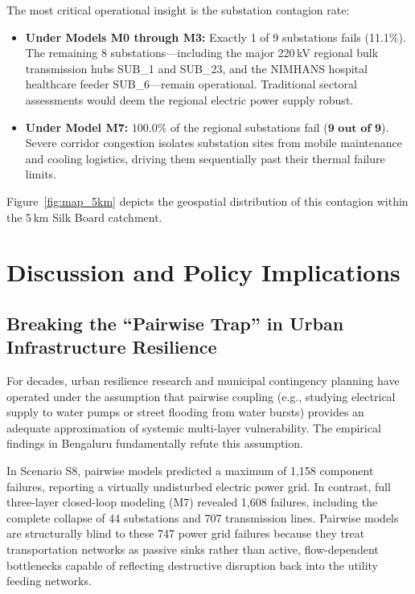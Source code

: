 The most critical operational insight is the substation contagion rate:
\begin{itemize}
    \item \textbf{Under Models M0 through M3:} Exactly 1 of 9 substations fails (11.1\%). The remaining 8 substations---including the major 220\,kV regional bulk transmission hubs SUB\_1 and SUB\_23, and the NIMHANS hospital healthcare feeder SUB\_6---remain operational. Traditional sectoral assessments would deem the regional electric power supply robust.
    \item \textbf{Under Model M7:} $\mathbf{100.0\%}$ of the regional substations fail ($\mathbf{9\text{ out of }9}$). Severe corridor congestion isolates substation sites from mobile maintenance and cooling logistics, driving them sequentially past their thermal failure limits.
\end{itemize}

Figure~\ref{fig:map_5km} depicts the geospatial distribution of this contagion within the 5\,km Silk Board catchment.

\section{Discussion and Policy Implications}
\label{sec:discussion}

\subsection{Breaking the ``Pairwise Trap'' in Urban Infrastructure Resilience}

For decades, urban resilience research and municipal contingency planning have operated under the assumption that pairwise coupling (e.g., studying electrical supply to water pumps or street flooding from water bursts) provides an adequate approximation of systemic multi-layer vulnerability. The empirical findings in Bengaluru fundamentally refute this assumption.

In Scenario S8, pairwise models predicted a maximum of 1,158 component failures, reporting a virtually undisturbed electric power grid. In contrast, full three-layer closed-loop modeling (M7) revealed 1,608 failures, including the complete collapse of 44 substations and 707 transmission lines. Pairwise models are structurally blind to these 747 power grid failures because they treat transportation networks as passive sinks rather than active, flow-dependent bottlenecks capable of reflecting destructive disruption back into the utility feeding networks.

